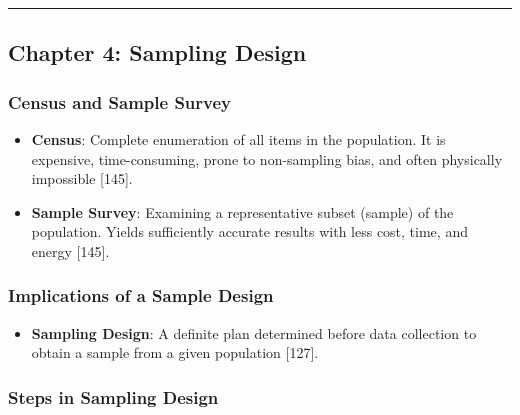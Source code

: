 \documentclass[
]{article}
\providecommand{\tightlist}{%
  \setlength{\itemsep}{0pt}\setlength{\parskip}{0pt}}
\begin{document}
\begin{center}\rule{0.5\linewidth}{0.5pt}\end{center}

\subsection{Chapter 4: Sampling Design}\label{chapter-4-sampling-design}

\subsubsection{Census and Sample Survey}\label{census-and-sample-survey}

\begin{itemize}
\tightlist
\item
  \textbf{Census}: Complete enumeration of all items in the population.
  It is expensive, time-consuming, prone to non-sampling bias, and often
  physically impossible {[}145{]}.
\item
  \textbf{Sample Survey}: Examining a representative subset (sample) of
  the population. Yields sufficiently accurate results with less cost,
  time, and energy {[}145{]}.
\end{itemize}

\subsubsection{Implications of a Sample
Design}\label{implications-of-a-sample-design}

\begin{itemize}
\tightlist
\item
  \textbf{Sampling Design}: A definite plan determined before data
  collection to obtain a sample from a given population {[}127{]}.
\end{itemize}

\subsubsection{Steps in Sampling Design}\label{steps-in-sampling-design}
\end{document}
